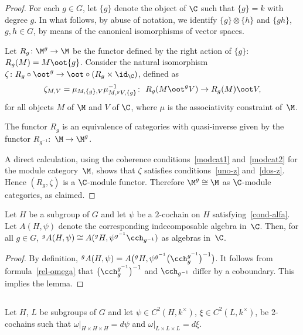 \begin{proof} For each $g \in G$, let $\{g\}$ denote the object of $\C$ such that $\{g\} = k$ with degree $g$. In what follows, by abuse of notation, we identify $\{g\} \otimes \{h\}$ and $\{gh\}$, $g, h \in G$, by means of the canonical isomorphisms of vector spaces.

Let $R_g\colon \M^g \to \M$ be the functor def\/ined by the right action of $\{g\}$: $R_g(M) = M \oot \{g\}$. Consider the natural isomorphism $\zeta\colon R_g \circ \oot^g \to \oot \circ (R_g \times \id_\C)$, def\/ined as
\begin{gather*}\zeta_{M, V} = \mu_{M, \{g\}, V} \mu^{-1}_{M, {}^g V, \{g\}}\colon \ R_g(M\oot^g V) \to R_g(M) \oot V,
\end{gather*} for all objects $M$ of $\M$ and $V$ of $\C$, where $\mu$ is the associativity constraint of~$\M$.

The functor $R_g$ is an equivalence of categories with quasi-inverse given by the functor $R_{g^{-1}}\colon$ $\M \to \M^g$.

A direct calculation, using the coherence conditions~\eqref{modcat1} and~\eqref{modcat2} for the module category~$\M$, shows that $\zeta$ satisf\/ies conditions~\eqref{uno-z} and~\eqref{dos-z}. Hence $(R_g, \zeta)$ is a $\C$-module functor. Therefore $\M^g \cong \M$ as $\C$-module categories, as claimed. \end{proof}

\begin{Lemma}\label{gdea} Let $H$ be a subgroup of $G$ and let $\psi$ be a $2$-cochain on $H$ satisfying~\eqref{cond-alfa}. Let $A(H, \psi)$ denote the corresponding indecomposable algebra in~$\C$. Then, for all $g \in G$, ${}^gA(H, \psi) \cong A({}^gH, \psi^{g^{-1}} \cch_{g^{-1}})$ as algebras in~$\C$.
\end{Lemma}

\begin{proof} By def\/inition, ${}^gA(H, \psi) = A\big({}^gH, \psi^{g^{-1}} \big(\cch_{g}^{g^{-1}}\big)^{-1}\big)$. It follows from formula~\eqref{rel-omega} that $\big(\cch_{g}^{g^{-1}}\big)^{-1}$ and $\cch_{g^{-1}}$ dif\/fer by a coboundary. This implies the lemma. \end{proof}

\subsection{} Let $H$, $L$ be subgroups of $G$ and let $\psi \in C^2(H, k^\times)$, $\xi \in C^2(L, k^\times)$, be 2-cochains such that $\omega\vert_{H \times H \times H} = d\psi$ and $\omega\vert_{L \times L \times L} = d\xi$.

